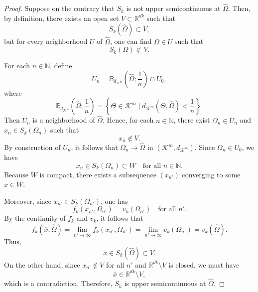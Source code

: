 \documentclass[sn-mathphys-num]{sn-jnl}%
\def\Hat{\widehat}
\theoremstyle{definition}
\begin{document}
\begin{proof}
	Suppose on the contrary that $S_k$ is not upper semicontinuous at $\Hat\Omega$. Then, by definition, there exists an open set $V\subset \mathbb{R}^{dk}$ such that
	\[
	S_k(\Hat\Omega)\subset V,
	\]
	but for every neighborhood $U$ of $\Hat\Omega$, one can find $\Omega\in U$ such that
	\[
	S_k(\Omega)\not\subset V.
	\]
	
	For each $n\in\mathbb{N}$, define
	\[
	U_n=\mathbb{B}_{d_{\mathcal{K}^m}}\left(\Hat\Omega;\frac{1}{n}\right)\cap U_0,
	\]
	where
	\[
	\mathbb{B}_{d_{\mathcal{K}^m}}\left(\Hat\Omega;\frac{1}{n}\right)
	=\left\{\Theta\in\mathcal{K}^m \mid d_{\mathcal{K}^m}(\Theta,\Hat\Omega)<\frac{1}{n}\right\}.
	\]
	Then $U_n$ is a neighborhood of $\Hat\Omega$. Hence, for each $n\in\mathbb{N}$, there exist $\Omega_n\in U_n$ and $x_n\in S_k(\Omega_n)$ such that
	\[
	x_n\notin V.
	\]
	By construction of $U_n$, it follows that $\Omega_n\to \Hat\Omega$ in $(\mathcal{K}^m,d_{\mathcal{K}^m})$. Since $\Omega_n\in U_0$, we have
	\[
	x_n\in S_k(\Omega_n)\subset W \quad \text{for all } n\in\mathbb{N}.
	\]
	Because $W$ is compact, there exists a subsequence $(x_{n'})$ converging to some $\overline{x}\in W$.
	
	Moreover, since $x_{n'}\in S_k(\Omega_{n'})$, one has
	\[
	f_k(x_{n'},\Omega_{n'})=v_k(\Omega_{n'}) \quad \text{for all } n'.
	\]
	By the continuity of $f_k$ and $v_k$, it follows that
	\[
	f_k(\overline{x},\Hat\Omega)
	=\lim_{n'\to\infty} f_k(x_{n'},\Omega_{n'})
	=\lim_{n'\to\infty} v_k(\Omega_{n'})
	=v_k(\Hat\Omega).
	\]
	Thus,
	\[
	\overline{x}\in S_k(\Hat\Omega)\subset V.
	\]
	On the other hand, since $x_{n'}\notin V$ for all $n'$ and $\mathbb{R}^{dk}\setminus V$ is closed, we must have
	\[
	\overline{x}\in \mathbb{R}^{dk}\setminus V,
	\]
	which is a contradiction. Therefore, $S_k$ is upper semicontinuous at $\Hat\Omega$. 
\end{proof}
\end{document}
